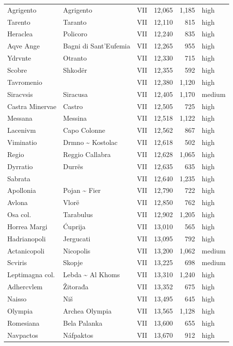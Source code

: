 \documentclass[11pt,a4paper]{article}
\begin{document}
{\begin{longtable}{p{4.6cm}p{5.2cm}lrrl}
Agrigento & Agrigento & VII & 12,065 & 1,185 & high\\
Tarento & Taranto & VII & 12,110 & 815 & high\\
Heraclea & Policoro & VII & 12,240 & 835 & high\\
Aqve Ange & Bagni di Sant'Eufemia & VII & 12,265 & 955 & high\\
Ydrvnte & Otranto & VII & 12,330 & 715 & high\\
Scobre & Shkodër & VII & 12,355 & 592 & high\\
Tavromenio &  & VII & 12,380 & 1,120 & high\\
Siracvsis & Siracusa & VII & 12,405 & 1,170 & medium\\
Castra Minervae & Castro & VII & 12,505 & 725 & high\\
Messana & Messina & VII & 12,518 & 1,122 & high\\
Lacenivm & Capo Colonne & VII & 12,562 & 867 & high\\
Viminatio & Drmno \textasciitilde{} Kostolac & VII & 12,618 & 502 & high\\
Regio & Reggio Callabra & VII & 12,628 & 1,065 & high\\
Dyrratio & Durrës & VII & 12,635 & 635 & high\\
Sabrata &  & VII & 12,640 & 1,235 & high\\
Apollonia & Pojan \textasciitilde{} Fier & VII & 12,790 & 722 & high\\
Avlona & Vlorë & VII & 12,850 & 762 & high\\
Osa col. & Tarabulus & VII & 12,902 & 1,205 & high\\
Horrea Margi & Ćuprija & VII & 13,010 & 565 & high\\
Hadrianopoli & Jergucati & VII & 13,095 & 792 & high\\
Actanicopoli & Nicopolis & VII & 13,200 & 1,062 & medium\\
Scviris & Skopje & VII & 13,225 & 698 & medium\\
Leptimagna col. & Lebda \textasciitilde{} Al Khoms & VII & 13,310 & 1,240 & high\\
Adhercvlem & Žitorađa & VII & 13,352 & 675 & high\\
Naisso & Niš & VII & 13,495 & 645 & high\\
Olympia & Archea Olympia & VII & 13,565 & 1,128 & high\\
Romesiana & Bela Palanka & VII & 13,600 & 655 & high\\
Navpactos & Náfpaktos & VII & 13,670 & 912 & high\\

\end{longtable}}
\end{document}
